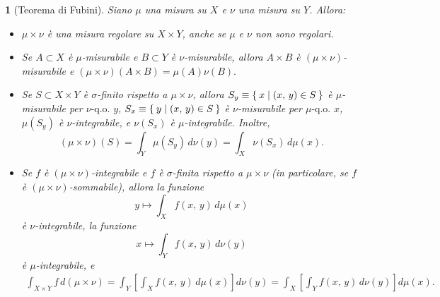 \documentclass[a4paper,10pt,openright,oneside]{book}
\theoremstyle{theoremstyle}
\theoremstyle{theoremstylewoheader}
\newtheorem{teorema2}[teorema]{}
\theoremstyle{theoremstyle}
\theoremstyle{proofsecstyle}
\theoremstyle{nonumberplain}
\newcommand{\qogni}[2]{\ensuremath{#2\text{-q.o. $\!#1$}}}
\begin{document}
\begin{teorema2}[Teorema di Fubini]
\label{thm:fubini}
Siano $\mu$ una misura su $X$ e $\nu$ una misura su $Y$. Allora:
\begin{itemize}
\item[(i)] $\mu\times\nu$ è una misura regolare su $X \times Y$, anche se $\mu$ e $\nu$ non sono regolari.
\item[(ii)] Se $A \subset X$ è $\mu$-misurabile e $B \subset Y$ è $\nu$-misurabile, allora $A \times B$ è $(\mu\times\nu)$-misurabile e $(\mu\times\nu)(A \times B) = \mu(A)\nu(B).$
\item[(iii)] Se $S \subset X \times Y$ è $\sigma$-finito rispetto a $\mu\times\nu$, allora $S_y \equiv \Set{ x | (x,\, y) \in S }$ è $\mu$-misurabile per $\qogni{y}{\nu}$, $S_x \equiv \Set{ y | (x,\, y) \in S }$ è $\nu$-misurabile per $\qogni{x}{\mu}$, $\mu(S_y)$ è $\nu$-integrabile, e $\nu(S_x)$ è $\mu$-integrabile. Inoltre,
\[
(\mu\times\nu) (S) = \int_Y \mu(S_y)\, d\nu(y) = \int_X \nu(S_x)\, d\mu(x).
\]
\item[(iv)] Se $f$ è $(\mu\times\nu)$-integrabile e $f$ è $\sigma$-finita rispetto a $\mu\times\nu$ (in particolare, se $f$ è $(\mu\times\nu)$-sommabile), allora la funzione
\[
y \mapsto \int_X f(x,\, y)\, d\mu(x)
\]
è $\nu$-integrabile, la funzione
\[
x \mapsto \int_Y f(x,\, y)\, d\nu(y)
\]
è $\mu$-integrabile, e
\begin{align*}
\int_{X \times Y} f\, d(\mu\times\nu) = \int_Y \left[\int_X f(x,\, y)\, d\mu(x)\right] d\nu(y) = \int_X \left[\int_Y f(x,\, y)\, d\nu(y)\right] d\mu(x).
\end{align*}
\end{itemize}
\end{teorema2}
\end{document}
